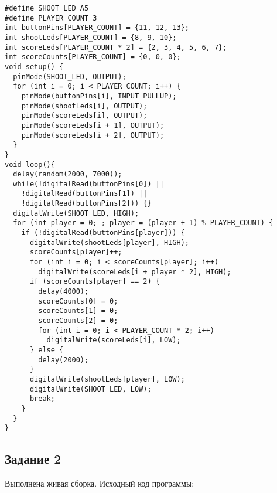 \documentclass[a4paper,14pt]{extarticle}
\begin{document}
  \begingroup
    \fontsize{14pt}{10pt}\selectfont
    \linespread{1}
    \begin{verbatim}
#define SHOOT_LED A5
#define PLAYER_COUNT 3
int buttonPins[PLAYER_COUNT] = {11, 12, 13};
int shootLeds[PLAYER_COUNT] = {8, 9, 10};
int scoreLeds[PLAYER_COUNT * 2] = {2, 3, 4, 5, 6, 7};
int scoreCounts[PLAYER_COUNT] = {0, 0, 0};
void setup() {
  pinMode(SHOOT_LED, OUTPUT);
  for (int i = 0; i < PLAYER_COUNT; i++) {
    pinMode(buttonPins[i], INPUT_PULLUP);
    pinMode(shootLeds[i], OUTPUT);
    pinMode(scoreLeds[i], OUTPUT);
    pinMode(scoreLeds[i + 1], OUTPUT);
    pinMode(scoreLeds[i + 2], OUTPUT);
  }
}
void loop(){
  delay(random(2000, 7000));
  while(!digitalRead(buttonPins[0]) || 
    !digitalRead(buttonPins[1]) || 
    !digitalRead(buttonPins[2])) {}
  digitalWrite(SHOOT_LED, HIGH);
  for (int player = 0; ; player = (player + 1) % PLAYER_COUNT) {
    if (!digitalRead(buttonPins[player])) {
      digitalWrite(shootLeds[player], HIGH);
      scoreCounts[player]++;
      for (int i = 0; i < scoreCounts[player]; i++)
        digitalWrite(scoreLeds[i + player * 2], HIGH);
      if (scoreCounts[player] == 2) {
        delay(4000);
        scoreCounts[0] = 0;
        scoreCounts[1] = 0;
        scoreCounts[2] = 0;
        for (int i = 0; i < PLAYER_COUNT * 2; i++)
          digitalWrite(scoreLeds[i], LOW);
      } else {
        delay(2000);
      }
      digitalWrite(shootLeds[player], LOW);
      digitalWrite(SHOOT_LED, LOW);
      break;
    }
  }
}
    \end{verbatim}
  \endgroup

  \subsection*{\hspace{12.5mm}Задание 2}
  Выполнена живая сборка. Исходный код программы:
\end{document}
